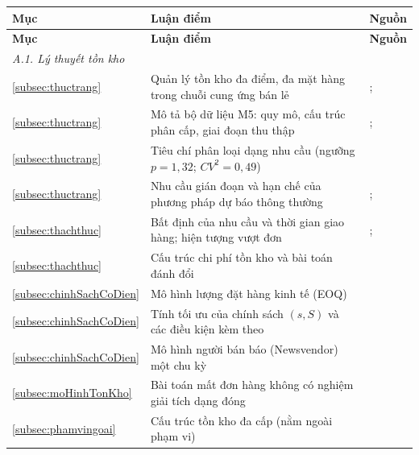 \begin{longtable}{|p{}|p{}|p{}|}
\hline
\textbf{Mục} & \textbf{Luận điểm} & \textbf{Nguồn} \\
\hline
\endfirsthead
\hline
\textbf{Mục} & \textbf{Luận điểm} & \textbf{Nguồn} \\
\hline
\endhead

\multicolumn{3}{l}{\textit{A.1. Lý thuyết tồn kho}} \\
\hline
\ref{subsec:thuctrang} & Quản lý tồn kho đa điểm, đa mặt hàng trong chuỗi cung ứng bán lẻ &
\textcite{silver2016}; \textcite{zipkin2000} \\

\ref{subsec:thuctrang} & Mô tả bộ dữ liệu M5: quy mô, cấu trúc phân cấp, giai đoạn thu thập &
\textcite{makridakis2022background}; \textcite{m5dataset} \\

\ref{subsec:thuctrang} & Tiêu chí phân loại dạng nhu cầu (ngưỡng $p = 1{,}32$; $CV^2 = 0{,}49$) &
\textcite{syntetos2005categorization} \\

\ref{subsec:thuctrang} & Nhu cầu gián đoạn và hạn chế của phương pháp dự báo thông thường &
\textcite{croston1972}; \textcite{syntetos2005accuracy} \\

\ref{subsec:thachthuc} & Bất định của nhu cầu và thời gian giao hàng; hiện tượng vượt đơn &
\textcite{zipkin2000}; \textcite{silver2016} \\

\ref{subsec:thachthuc} & Cấu trúc chi phí tồn kho và bài toán đánh đổi &
\textcite{zipkin2000} \\

\ref{subsec:chinhSachCoDien} & Mô hình lượng đặt hàng kinh tế (EOQ) &
\textcite{harris1913} \\

\ref{subsec:chinhSachCoDien} & Tính tối ưu của chính sách $(s, S)$ và các điều kiện kèm theo &
\textcite{scarf1960} \\

\ref{subsec:chinhSachCoDien} & Mô hình người bán báo (Newsvendor) một chu kỳ &
\textcite{arrow1951} \\

\ref{subsec:moHinhTonKho} & Bài toán mất đơn hàng không có nghiệm giải tích dạng đóng &
\textcite{zipkin2008} \\

\ref{subsec:phamvingoai} & Cấu trúc tồn kho đa cấp (nằm ngoài phạm vi) &
\textcite{clark1960} \\


\end{longtable}
